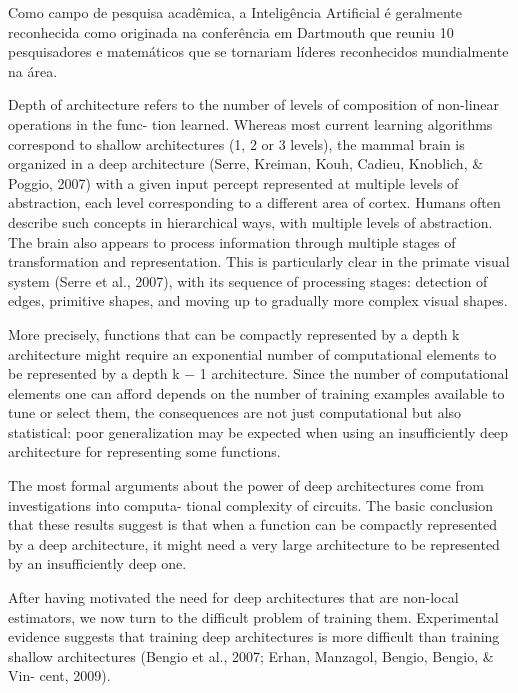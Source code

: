 \documentclass[cic,tc]{iiufrgs}
\begin{document}
Como campo de pesquisa acadêmica, a Inteligência Artificial é geralmente
reconhecida como originada na conferência em Dartmouth que reuniu 10
pesquisadores e matemáticos que se tornariam líderes reconhecidos
mundialmente na área.\cite{russell2003norvig}


  Depth of architecture refers to the number of levels of composition of
  non-linear operations in the func- tion learned. Whereas most current
  learning algorithms correspond to shallow architectures (1, 2 or 3 levels),
  the mammal brain is organized in a deep architecture (Serre, Kreiman, Kouh,
  Cadieu, Knoblich, & Poggio, 2007) with a given input percept represented at
  multiple levels of abstraction, each level corresponding to a different area
  of cortex.  Humans often describe such concepts in hierarchical ways, with
  multiple levels of abstraction. The brain also appears to process information
  through multiple stages of transformation and representation. This is
  particularly clear in the primate visual system (Serre et al., 2007), with
  its sequence of processing stages: detection of edges, primitive shapes, and
  moving up to gradually more complex visual shapes.\cite{bengio2009learning}

  More precisely, functions that can be compactly represented by a depth k
  architecture might require an exponential number of computational elements to
  be represented by a depth k − 1 architecture. Since the number of
  computational elements one can afford depends on the number of training
  examples available to tune or select them, the consequences are not just
  computational but also statistical: poor generalization may be expected when
  using an insufficiently deep architecture for representing some
  functions.\cite{bengio2009learning}

  The most formal arguments about the power of deep architectures come from
  investigations into computa- tional complexity of circuits. The basic
  conclusion that these results suggest is that when a function can be
  compactly represented by a deep architecture, it might need a very large
  architecture to be represented by an insufficiently deep
  one.\cite{bengio2009learning}

  After having motivated the need for deep architectures that are non-local
  estimators, we now turn to the difficult problem of training them.
  Experimental evidence suggests that training deep architectures is more
  difficult than training shallow architectures (Bengio et al., 2007; Erhan,
  Manzagol, Bengio, Bengio, & Vin- cent, 2009).\cite{bengio2009learning}
\end{document}
